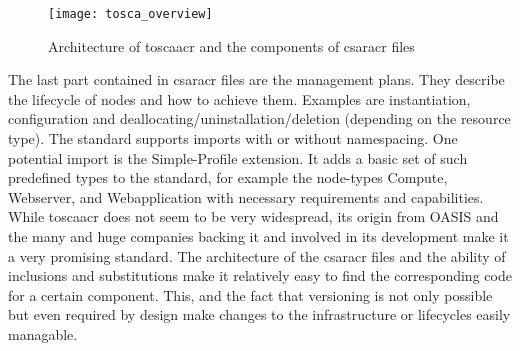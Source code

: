 \begin{figure}[H]
  \texttt{[image: tosca\_overview]}
  \centering
  \caption{Architecture of \gls{toscaacr} and the components of \gls{csaracr} files} %
  \label{image:tosca_overview}
\end{figure}

The last part contained in \gls{csaracr} files are the management plans. They describe the lifecycle of nodes and how to achieve them. Examples are instantiation, configuration and deallocating/uninstallation/deletion (depending on the resource type).
\newline
The standard supports imports with or without namespacing. One potential import is the Simple-Profile extension.
It adds a basic set of such predefined types to the standard, for example the node-types Compute, Webserver, and Webapplication with necessary requirements and capabilities.
\newline
While \gls{toscaacr} does not seem to be very widespread, its origin from OASIS and the many and huge companies backing it and involved in its development make it a very promising standard.
\newline
The architecture of the \gls{csaracr} files and the ability of inclusions and substitutions make it relatively easy to find the corresponding code for a certain component.
\newline
This, and the fact that versioning is not only possible but even required by design make changes to the infrastructure or lifecycles easily managable.




